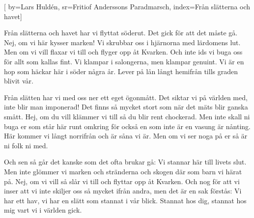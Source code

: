 
[
	by={Lars Huldén},
	sr={Fritiof Anderssons Paradmarsch},
	index={Från slätterna och havet}] 

\beginverse*
Från slätterna och havet har vi flyttat söderut.
Det gick för att det måste gå.
Nej, om vi här kysser marken!
Vi skrubbar oss i hjärnorna med lärdomens lut.
Men om vi vill
flaxar vi till
och flyger opp åt Kvarken.
Och inte ids vi buga oss för allt som kallas fint.
Vi klampar i salongerna, men klampar genuint.
Vi är en hop som häckar här
i söder några år.
Lever på lån
långt hemifrån
tills graden blivit vår.
\endverse

\beginverse*
Från slätten har vi med oss ner ett eget ögonmått.
Det siktar vi på världen med,
inte blir man imponerad!
Det finns så mycket stort som när det mäts blir ganska
smått.
Hej, om du vill
klämmer vi till
så du blir rent chockerad.
Men inte skall ni buga er som står här runt omkring
för också en som inte är en vasung är nånting.
Här kommer vi långt norrifrån
och är såna vi är.
Men om vi ser
noga på er
så är ni folk ni med.
\endverse

\beginverse*
Och sen så går det kanske som det ofta brukar gå:
Vi stannar här till livets slut.
Men inte glömmer vi marken
och stränderna och skogen där som barn vi härat på.
Nej, om vi vill
så slår vi till
och flyttar opp åt Kvarken.
Och nog för att vi inser att vi inte skiljer oss
så mycket ifrån andra, men det är en sak förstås:
Vi har ett hav, vi har en slätt
som stannat i vår blick.
Stannat hos dig,
stannat hos mig
vart vi i världen gick.
\endverse
\endsong
